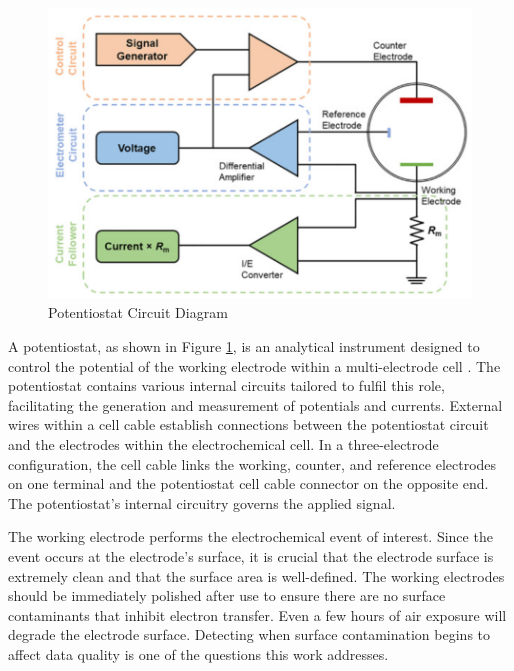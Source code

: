 \begin{figure}[h!]
  \centering
    \includegraphics[width=1.0\textwidth]{figures/potentiostat_diagram.png}
    \caption{Potentiostat Circuit Diagram}
    \label{potentiostat_diagram}
\end{figure}
A potentiostat, as shown in Figure \ref{potentiostat_diagram}, is an analytical instrument designed to control the potential of the working electrode within a multi-electrode cell \cite{Zoski2006-zx}. The potentiostat contains various internal circuits tailored to fulfil this role, facilitating the generation and measurement of potentials and currents. External wires within a cell cable establish connections between the potentiostat circuit and the electrodes within the electrochemical cell. In a three-electrode configuration, the cell cable links the working, counter, and reference electrodes on one terminal and the potentiostat cell cable connector on the opposite end. The potentiostat's internal circuitry governs the applied signal. 

The working electrode performs the electrochemical event of interest. Since the event occurs at the electrode's surface, it is crucial that the electrode surface is extremely clean and that the surface area is well-defined. The working electrodes should be immediately polished after use to ensure there are no surface contaminants that inhibit electron transfer. Even a few hours of air exposure will degrade the electrode surface. Detecting when surface contamination begins to affect data quality is one of the questions this work addresses.

